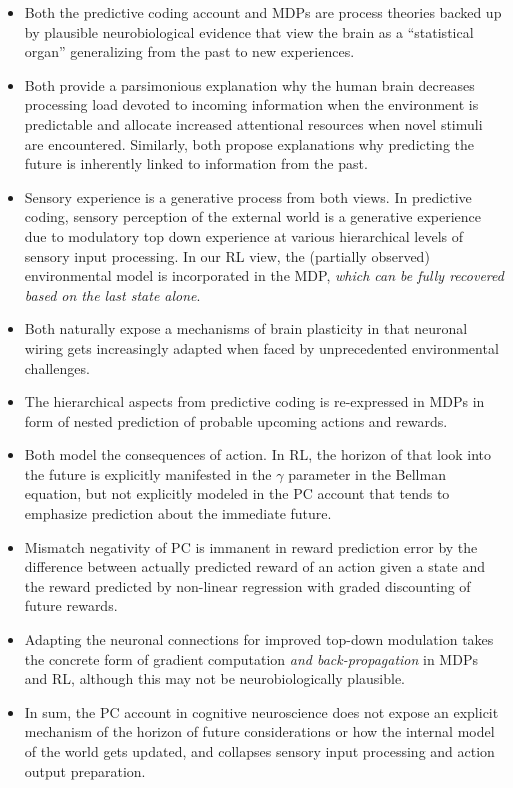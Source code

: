 \documentclass{article} %
\begin{document}
\begin{itemize}
  \item Both the predictive coding account and MDPs
  are process theories backed up by plausible
  neurobiological evidence that
  view the brain as a ``statistical organ''
  generalizing from the past to new experiences.
  \item Both provide a parsimonious explanation why the
  human brain decreases processing load devoted to incoming information
  when the environment is predictable and allocate increased
  attentional resources when novel stimuli are encountered.
  Similarly, both propose explanations why
  predicting the future is inherently
  linked to information from the past.
  \item Sensory experience is a generative process from both views.
  In predictive coding, sensory perception of the external world
  is a generative experience due to modulatory top down experience at
  various hierarchical levels of sensory input processing.
  In our RL view, the (partially observed)
  environmental model is incorporated in the MDP,
  \textit{which can be fully recovered based on the last
  state alone}.
  \item Both naturally expose a mechanisms of brain plasticity in that
  neuronal wiring gets increasingly adapted
  when faced by unprecedented environmental
  challenges.
  \item The hierarchical aspects from predictive coding
  is re-expressed in MDPs in form of
  nested prediction of probable upcoming actions and rewards.
  \item Both model the consequences of action. In RL, the horizon of that
  look into the future is explicitly manifested in the $\gamma$ parameter
  in the Bellman equation, but not
  explicitly modeled in the PC account that
  tends to emphasize prediction about the
  immediate future.
  \item Mismatch negativity of PC is immanent in reward prediction error
  by the difference between actually predicted reward of an action given
  a state and the reward predicted by non-linear regression with graded
  discounting of future rewards.
  \item Adapting the neuronal connections for improved top-down modulation
  takes the concrete form of gradient computation
  \textit{and back-propagation} in MDPs and RL,
  although this may not be neurobiologically plausible.
  \item In sum,
  the PC account in cognitive neuroscience does not expose an explicit
  mechanism of the horizon of future considerations or
  how the internal model of the world gets updated,
  and collapses sensory input processing and action output preparation.
\end{itemize}
\end{document}
